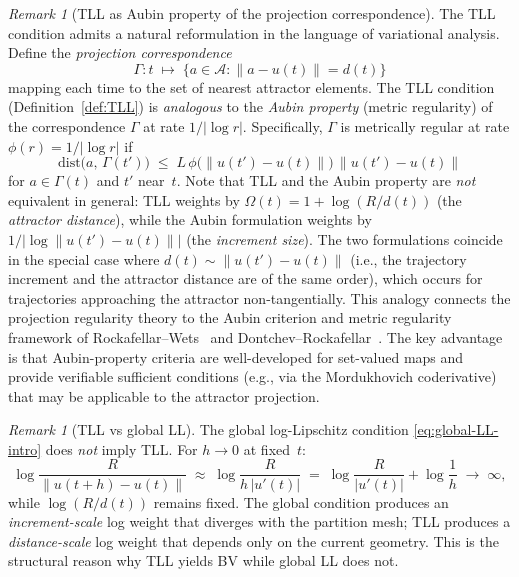 \documentclass[12pt,a4paper]{article}
\theoremstyle{definition}
\theoremstyle{plain}
\theoremstyle{remark}
\newtheorem{remark}[definition]{Remark}
\newcommand{\dist}{\mathrm{dist}}
\begin{document}
\begin{remark}[TLL as Aubin property of the projection correspondence]
\label{rem:TLL-Aubin}
The TLL condition admits a natural reformulation in the language of
variational analysis.  Define the \emph{projection correspondence}
\[
  \Gamma: t \;\mapsto\;
  \bigl\{a \in \mathcal{A} : \|a - u(t)\| = d(t)\bigr\}
\]
mapping each time to the set of nearest attractor elements.
The TLL condition (Definition~\ref{def:TLL}) is \emph{analogous}
to the \emph{Aubin property} (metric regularity) of the correspondence
$\Gamma$ at rate $1/|\log r|$.  Specifically, $\Gamma$ is
metrically regular at rate $\phi(r) = 1/|\log r|$ if
\[
  \dist\bigl(a,\, \Gamma(t')\bigr)
  \;\le\;
  L\,\phi\bigl(\|u(t') - u(t)\|\bigr)\,\|u(t') - u(t)\|
\]
for $a \in \Gamma(t)$ and $t'$ near~$t$.
Note that TLL and the Aubin property are \emph{not} equivalent in
general: TLL weights by $\Omega(t) = 1 + \log(R/d(t))$
(the \emph{attractor distance}), while the Aubin formulation
weights by $1/|\log\|u(t')-u(t)\||$ (the \emph{increment size}).
The two formulations coincide in the special case where
$d(t) \sim \|u(t')-u(t)\|$ (i.e., the trajectory increment and
the attractor distance are of the same order), which occurs for
trajectories approaching the attractor non-tangentially.
This analogy connects the projection regularity theory to the
Aubin criterion and metric regularity framework of
Rockafellar--Wets~\cite{RockafellarWets1998} and
Dontchev--Rockafellar~\cite{DontchevRockafellar2009}.
The key advantage is that Aubin-property criteria are
well-developed for set-valued maps and provide verifiable sufficient
conditions (e.g., via the Mordukhovich coderivative) that may be
applicable to the attractor projection.
\end{remark}

\begin{remark}[TLL vs global LL]
\label{rem:TLL-vs-LL}
The global log-Lipschitz condition \eqref{eq:global-LL-intro}
does \emph{not} imply TLL.  For $h \to 0$ at fixed~$t$:
\[
  \log\frac{R}{\|u(t+h)-u(t)\|}
  \;\approx\;
  \log\frac{R}{h\,|u'(t)|}
  \;=\;
  \log\frac{R}{|u'(t)|} + \log\frac{1}{h}
  \;\to\; \infty,
\]
while $\log(R/d(t))$ remains fixed.  The global condition
produces an \emph{increment-scale} log weight that diverges
with the partition mesh; TLL produces a \emph{distance-scale}
log weight that depends only on the current geometry.
This is the structural reason why TLL yields BV while
global LL does not.
\end{remark}


\end{document}
